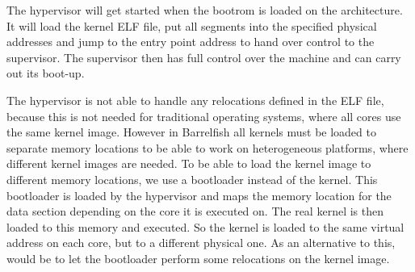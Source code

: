 \documentclass[a4paper,twoside]{report} %
\begin{document}
The hypervisor will get started when the bootrom is loaded on the architecture. It will load the kernel ELF file, put all segments into the specified physical addresses and jump to the entry point address to hand over control to the supervisor. The supervisor then has full control over the machine and can carry out its boot-up.

The hypervisor is not able to handle any relocations defined in the ELF file, because this is not needed for traditional operating systems, where all cores use the same kernel image. However in Barrelfish all kernels must be loaded to separate memory locations to be able to work on heterogeneous platforms, where different kernel images are needed. To be able to load the kernel image to different memory locations, we use a bootloader instead of the kernel. This bootloader is loaded by the hypervisor and maps the memory location for the data section depending on the core it is executed on. The real kernel is then loaded to this memory and executed. So the kernel is loaded to the same virtual address on each core, but to a different physical one. As an alternative to this, would be to let the bootloader perform some relocations on the kernel image.
\end{document}
